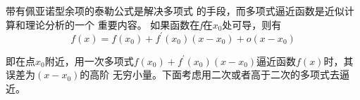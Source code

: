 \newpage
带有佩亚诺型余项的泰勒公式是解决多项式
的手段，而多项式逼近函数是近似计算和理论分析的一个
重要内容。
如果函数在\emph{f}在$x_0$处可导，则有
\begin{equation}
    f(x)=f(x_0)+f^{'}(x_0)(x-x_0)+o(x-x_0)
    \label{eq::eq1}
\end{equation}

即在点$x_0$附近，用一次多项式$f(x_0)+f^{'}(x_0)(x-x_0)$逼近函数$f(x)$时，其误差为$(x-x_0)$的高阶
无穷小量。下面考虑用二次或者高于二次的多项式去逼近。